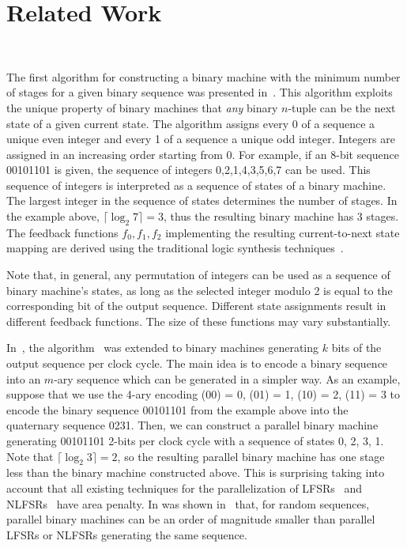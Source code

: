 \documentclass[10pt,conference]{IEEEtran}
\begin{document}
\section{Related Work}~\label{prev}

The first algorithm for constructing a binary machine with the minimum number of stages for a
given binary sequence was presented in~\cite{Du10aj}. This algorithm 
exploits the unique property of binary machines that {\em  any} binary $n$-tuple can be the next state of 
a given current state. 
The algorithm assigns every 0 of a sequence a unique even integer and every 1 of a sequence a unique odd integer.
Integers are assigned in an increasing order starting from 0. For example, if an 8-bit sequence
00101101 is given, the sequence of integers 0,2,1,4,3,5,6,7 can be used. This sequence of integers is interpreted as
a sequence of states of a binary machine. The largest integer in the sequence of states
determines the number of stages. In the example above, $\lceil \log_2 7 \rceil = 3$,
thus the resulting binary machine has 3 stages. 
The feedback
functions $f_0, f_1, f_2$ implementing the resulting current-to-next state mapping
are derived using the traditional logic synthesis 
techniques~\cite{espr}. 

Note that, in general, any permutation of integers 
can be used as a sequence of binary machine's states, as long as the selected integer modulo 2 is equal to the corresponding bit of the output sequence.
Different state assignments result in different feedback functions. The size of these 
functions may vary substantially. 


In~\cite{Du11a}, the algorithm~\cite{Du10aj} was extended to binary machines generating $k$ bits 
of the output sequence per clock cycle. 
The main idea is to encode a binary sequence into an $m$-ary sequence which can be 
generated in a simpler way. As an example,
suppose that we use the 4-ary encoding (00) = 0, (01) = 1, (10) = 2, (11) = 3
to encode the binary sequence 00101101 from the example above into
the  quaternary sequence 0231.
Then, we can construct a parallel binary machine generating 00101101 2-bits per clock cycle with a sequence 
of states 0, 2, 3, 1. Note that $\lceil \log_2 3 \rceil = 2$, so the resulting parallel binary machine has one stage
less than the binary machine constructed above. 
This is surprising taking into account that all existing techniques for the 
parallelization of LFSRs~\cite{PeZ92,MuS06} and NLFSRs~\cite{canniere-trivium,hell-grain} have area penalty.
In was shown in~\cite{Du11a} that, for random sequences,  
parallel binary machines can be an order of magnitude smaller than parallel LFSRs or NLFSRs generating the same sequence.
 
\end{document}
